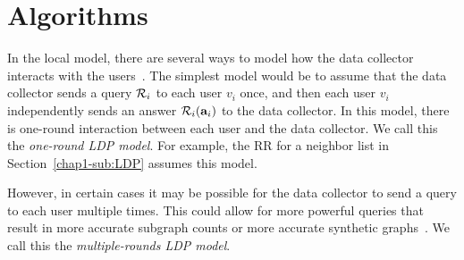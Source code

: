\section{Algorithms}
\label{chap1-sec:algorithms}
In the local model, 
there 
are several ways 
to 
model how the data collector interacts with 
the users~\cite{Duchi_FOCS13,Joseph_SODA20,qin2017generating}.
The simplest model 
would be 
to assume that 
the data collector sends 
a 
query $\mathcal{R}_i$ to each user $v_i$ once, 
and then 
each user $v_i$ independently sends an answer $\mathcal{R}_i(\mathbf{a}_i)$ to the data collector. 
In this model, there is one-round interaction between each user and the data collector. 
We call this the
\textit{one-round LDP model}. 
For example, the RR 
for a neighbor list in Section~\ref{chap1-sub:LDP} assumes this model.

However, in certain cases it may be possible 
for the data collector to send a query to each user multiple times. 
This could allow for more powerful queries that result in more accurate 
subgraph counts 
\cite{Sun_CCS19} 
or more accurate synthetic graphs~\cite{qin2017generating}. 
We call this the \textit{multiple-rounds LDP model}. 


